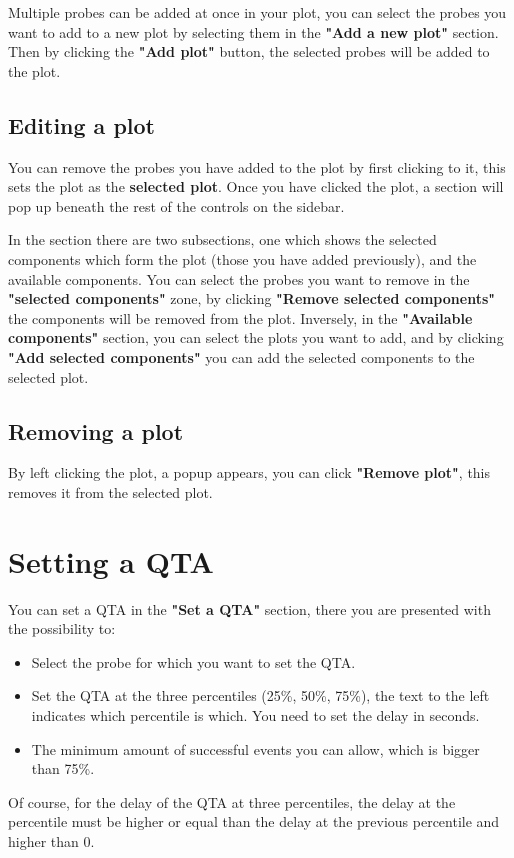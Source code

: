     Multiple probes can be added at once in your plot, you can select the probes you want to add to a new plot by selecting them in the \textbf{"Add a new plot"} section. Then by clicking the \textbf{"Add plot"} button, the selected probes will be added to the plot.

\subsection{Editing a plot}
    You can remove the probes you have added to the plot by first clicking to it, this sets the plot as the \textbf{selected plot}. Once you have clicked the plot, a section will pop up beneath the rest of the controls on the sidebar. 
    
    In the section there are two subsections, one which shows the selected components which form the plot (those you have added previously), and the available components. You can select the probes you want to remove in the \textbf{"selected components"} zone, by clicking \textbf{"Remove selected components"} the components will be removed from the plot. Inversely, in the \textbf{"Available components"} section, you can select the plots you want to add, and by clicking \textbf{"Add selected components"} you can add the selected components to the selected plot.

\subsection{Removing a plot}
    By left clicking the plot, a popup appears, you can click \textbf{"Remove plot"}, this removes it from the selected plot.

\section{Setting a QTA}
    You can set a QTA in the \textbf{"Set a QTA"} section, there you are presented with the possibility to:
    \begin{itemize}
        \item Select the probe for which you want to set the QTA.
        \item Set the QTA at the three percentiles (25\%, 50\%, 75\%), the text to the left indicates which percentile is which. You need to set the delay in seconds.
        \item The minimum amount of successful events you can allow, which is bigger than 75\%.
    \end{itemize}
    Of course, for the delay of the QTA at three percentiles, the delay at the percentile must be higher or equal than the delay at the previous percentile and higher than 0.

